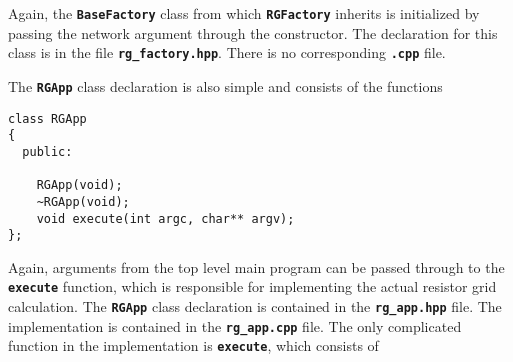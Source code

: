 Again, the \texttt{\textbf{BaseFactory}} class from which \texttt{\textbf{RGFactory}} inherits is initialized by passing the network argument through the constructor. The declaration for this class is in the file \texttt{\textbf{rg\_factory.hpp}}. There is no corresponding \texttt{\textbf{.cpp}} file.

The \texttt{\textbf{RGApp}} class declaration is also simple and consists of the functions

{
\color{red}
\begin{Verbatim}[fontseries=b]
class RGApp
{
  public:

    RGApp(void);
    ~RGApp(void);
    void execute(int argc, char** argv);
};
\end{Verbatim}
}

Again, arguments from the top level main program can be passed through to the
\texttt{\textbf{execute}} function, which is responsible for implementing the
actual resistor grid calculation. The \texttt{\textbf{RGApp}} class declaration
is contained in the \texttt{\textbf{rg\_app.hpp}} file. The implementation is
contained in the \texttt{\textbf{rg\_app.cpp}} file. The only complicated
function in the implementation is \texttt{\textbf{execute}}, which consists of


